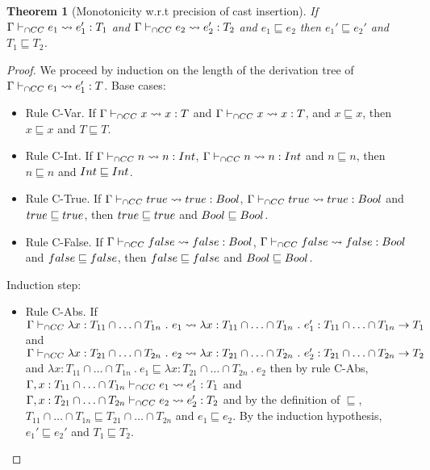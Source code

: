 \documentclass[a4paper]{article}
\newtheorem{theorem}{Theorem}[section]
\begin{document}
\begin{theorem}[Monotonicity w.r.t precision of cast insertion]
\label{monotonicity_wrt_precision_cast_insertion}
If $\Gamma \vdash_{\cap CC} e_1 \leadsto e_1' : T_1$ and $\Gamma \vdash_{\cap CC} e_2 \leadsto e_2' : T_2$ and $e_1 \sqsubseteq e_2$ then $e_1' \sqsubseteq e_2'$ and $T_1 \sqsubseteq T_2$.
\end{theorem}
\begin{proof}
We proceed by induction on the length of the derivation tree of $\Gamma \vdash_{\cap CC} e_1 \leadsto e_1' : T$.
Base cases:
\begin{itemize}
    \item Rule C-Var.
    If $\Gamma \vdash_{\cap CC} x \leadsto x : T$ and $\Gamma \vdash_{\cap CC} x \leadsto x : T$, and $x \sqsubseteq x$, then $x \sqsubseteq x$ and $T \sqsubseteq T$.
    \item Rule C-Int.
    If $\Gamma \vdash_{\cap CC} n \leadsto n : {Int}$, $\Gamma \vdash_{\cap CC} n \leadsto n : {Int}$ and $n \sqsubseteq n$, then $n \sqsubseteq n$ and ${Int} \sqsubseteq {\ensuremath{Int}}$.
    \item Rule C-True.
    If $\Gamma \vdash_{\cap CC} true \leadsto true : Bool$, $\Gamma \vdash_{\cap CC} true \leadsto true : Bool$ and $true \sqsubseteq true$, then $true \sqsubseteq true$ and $Bool \sqsubseteq Bool$.
    \item Rule C-False.
    If $\Gamma \vdash_{\cap CC} false \leadsto false : Bool$, $\Gamma \vdash_{\cap CC} false \leadsto false : Bool$ and $false \sqsubseteq false$, then $false \sqsubseteq false$ and $Bool \sqsubseteq Bool$.
\end{itemize}
Induction step:
\begin{itemize}
    \item Rule C-Abs.
    If $\Gamma \vdash_{\cap CC} \lambda x : T_{11} \cap \ldots \cap T_{1n}\ .\ e_1 \leadsto \lambda x : T_{11} \cap \ldots \cap T_{1n}\ .\ e_1' : T_{11} \cap \ldots \cap T_{1n} \rightarrow T_1$ and $\Gamma \vdash_{\cap CC} \lambda x : T_{21} \cap \ldots \cap T_{2n}\ .\ e_2 \leadsto \lambda x : T_{21} \cap \ldots \cap T_{2n}\ .\ e_2' : T_{21} \cap \ldots \cap T_{2n} \rightarrow T_2$ and $\lambda x : T_{11} \cap \ldots \cap T_{1n}\ .\ e_1 \sqsubseteq \lambda x : T_{21} \cap \ldots \cap T_{2n}\ .\ e_2$ then by rule C-Abs, $\Gamma, x : T_{11} \cap \ldots \cap T_{1n} \vdash_{\cap CC} e_1 \leadsto e_1': T_1$ and $\Gamma, x : T_{21} \cap \ldots \cap T_{2n} \vdash_{\cap CC} e_2 \leadsto e_2': T_2$ and by the definition of $\sqsubseteq$, $T_{11} \cap \ldots \cap T_{1n} \sqsubseteq T_{21} \cap \ldots \cap T_{2n}$ and $e_1 \sqsubseteq e_2$.
    By the induction hypothesis, $e_1' \sqsubseteq e_2'$ and $T_1 \sqsubseteq T_2$.

\end{itemize}
\end{proof}
\end{document}
